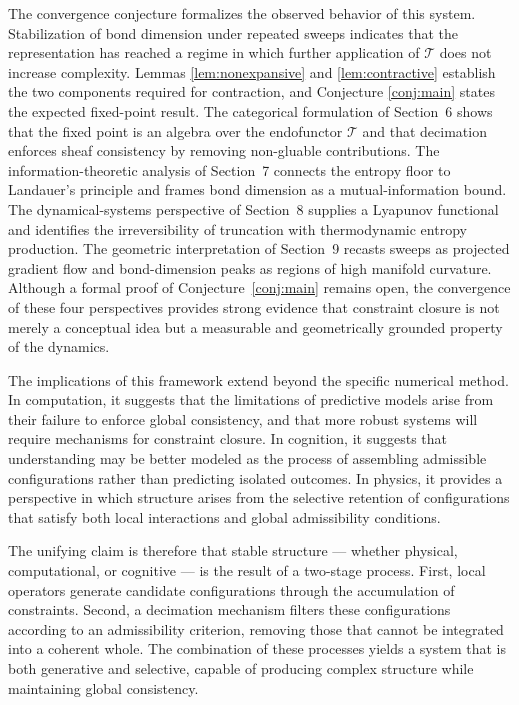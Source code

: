 \documentclass[11pt]{article}
\theoremstyle{definition}
\begin{document}
The convergence conjecture formalizes the observed behavior of this system.
Stabilization of bond dimension under repeated sweeps indicates that the
representation has reached a regime in which further application of $\mathcal{T}$
does not increase complexity. Lemmas \ref{lem:nonexpansive} and
\ref{lem:contractive} establish the two components required for contraction,
and Conjecture \ref{conj:main} states the expected fixed-point result.
The categorical formulation of Section~6 shows that the fixed point is an
algebra over the endofunctor $\mathcal{T}$ and that decimation enforces sheaf
consistency by removing non-gluable contributions. The information-theoretic
analysis of Section~7 connects the entropy floor to Landauer's principle and
frames bond dimension as a mutual-information bound. The dynamical-systems
perspective of Section~8 supplies a Lyapunov functional and identifies the
irreversibility of truncation with thermodynamic entropy production. The
geometric interpretation of Section~9 recasts sweeps as projected gradient
flow and bond-dimension peaks as regions of high manifold curvature.
Although a formal proof of Conjecture~\ref{conj:main} remains open, the
convergence of these four perspectives provides strong evidence that
constraint closure is not merely a conceptual idea but a measurable and
geometrically grounded property of the dynamics.

The implications of this framework extend beyond the specific numerical method.
In computation, it suggests that the limitations of predictive models arise
from their failure to enforce global consistency, and that more robust systems
will require mechanisms for constraint closure. In cognition, it suggests that
understanding may be better modeled as the process of assembling admissible
configurations rather than predicting isolated outcomes. In physics, it
provides a perspective in which structure arises from the selective retention
of configurations that satisfy both local interactions and global admissibility
conditions.

The unifying claim is therefore that stable structure --- whether physical,
computational, or cognitive --- is the result of a two-stage process. First,
local operators generate candidate configurations through the accumulation of
constraints. Second, a decimation mechanism filters these configurations
according to an admissibility criterion, removing those that cannot be
integrated into a coherent whole. The combination of these processes yields a
system that is both generative and selective, capable of producing complex
structure while maintaining global consistency.
\end{document}
